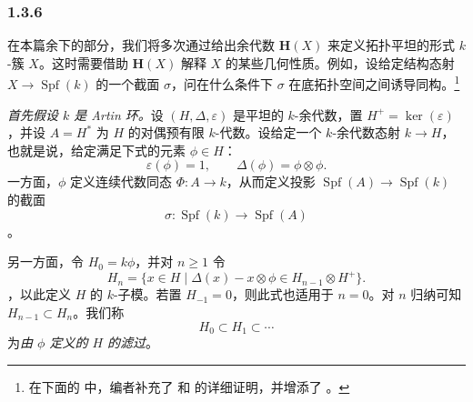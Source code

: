 \subsubsection*{1.3.6} \label{sga3:VIIB:1.3.6}

在本篇余下的部分，我们将多次通过给出余代数 \(\mathbf H(X)\) 来定义拓扑平坦的形式 \(k\)-簇 \(X\)。这时需要借助 \(\mathbf H(X)\) 解释 \(X\) 的某些几何性质。例如，设给定结构态射 \(X\to\operatorname{Spf}(k)\) 的一个截面 \(\sigma\)，问在什么条件下 \(\sigma\) 在底拓扑空间之间诱导同构。\footnote{\label{sga3:VIIB:nde:62}在下面的  中，编者补充了 \textup{} 和 \textup{} 的详细证明，并增添了 \textup{}。}

\textit{首先假设 \(k\) 是 Artin 环。}设 \((H,\Delta,\varepsilon)\) 是平坦的 \(k\)-余代数，置 \(H^+=\ker(\varepsilon)\)，并设 \(A=H^*\) 为 \(H\) 的对偶预有限 \(k\)-代数。设给定一个 \(k\)-余代数态射 \(k\to H\)，也就是说，给定满足下式的元素 \(\phi\in H\)：\[
  \varepsilon(\phi)=1,
  \qquad
  \Delta(\phi)=\phi\otimes\phi.
\] 一方面，\(\phi\) 定义连续代数同态 \(\Phi:A\to k\)，从而定义投影 \(\operatorname{Spf}(A)\to\operatorname{Spf}(k)\) 的截面 \[
  \sigma:\operatorname{Spf}(k)\longrightarrow\operatorname{Spf}(A)
\]。

另一方面，令 \(H_0=k\phi\)，并对 \(n\geq1\) 令 \[
  H_n
  =
  \{x\in H\mid
    \Delta(x)-x\otimes\phi\in H_{n-1}\otimes H^+\}.
\]，以此定义 \(H\) 的 \(k\)-子模。若置 \(H_{-1}=0\)，则此式也适用于 \(n=0\)。对 \(n\) 归纳可知 \(H_{n-1}\subset H_n\)。我们称 \[
  H_0\subset H_1\subset\cdots
\] 为\emph{由 \(\phi\) 定义的 \(H\) 的滤过}。

